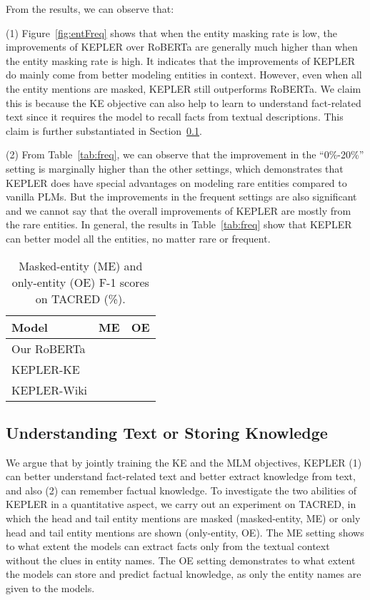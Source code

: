 From the results, we can observe that: 

(1) Figure~\ref{fig:entFreq} shows that when the entity masking rate is low, the improvements of KEPLER over RoBERTa are generally much higher than when the entity masking rate is high. It indicates that the improvements of KEPLER do mainly come from better modeling entities in context. However, even when all the entity mentions are masked, KEPLER still outperforms RoBERTa. We claim this is because the KE objective can also help to learn to understand fact-related text since it requires the model to recall facts from textual descriptions. This claim is further substantiated in Section~\ref{sec:uos}. 

(2) From Table~\ref{tab:freq}, we can observe that the improvement in the ``0\%-20\%'' setting is marginally higher than the other settings, which demonstrates that KEPLER does have special advantages on modeling rare entities compared to vanilla PLMs. But the improvements in the frequent settings are also significant and we cannot say that the overall improvements of KEPLER are mostly from the rare entities. In general, the results in Table~\ref{tab:freq} show that KEPLER can better model all the entities, no matter rare or frequent.

\begin{table}[h]
    \tablefont
	\centering
\begin{adjustbox}{max width=0.98\linewidth}
    \begin{tabular}{lcc}
        \toprule
        \textbf{Model} & \textbf{ME} & \textbf{OE}\\
        \midrule
        Our RoBERTa &  & \\
        KEPLER-KE &  &  \\
        KEPLER-Wiki &  & \\
        \bottomrule
    \end{tabular}
\end{adjustbox}
	\caption{Masked-entity (ME) and only-entity (OE) F-1 scores on TACRED (\%).}\label{tab:casestudy}
\end{table}

\subsection{Understanding Text or Storing Knowledge}


\label{sec:uos}

We argue that by jointly training the KE and the MLM objectives, KEPLER (1) can better understand fact-related text and better extract knowledge from text, and also (2) can remember factual knowledge. To investigate the two abilities of KEPLER in a quantitative aspect, we carry out an experiment on TACRED, in which the head and tail entity mentions are masked (masked-entity, ME) or only head and tail entity mentions are shown (only-entity, OE). The ME setting shows to what extent the models can extract facts only from the textual context without the clues in entity names. The OE setting demonstrates to what extent the models can store and predict factual knowledge, as only the entity names are given to the models.

